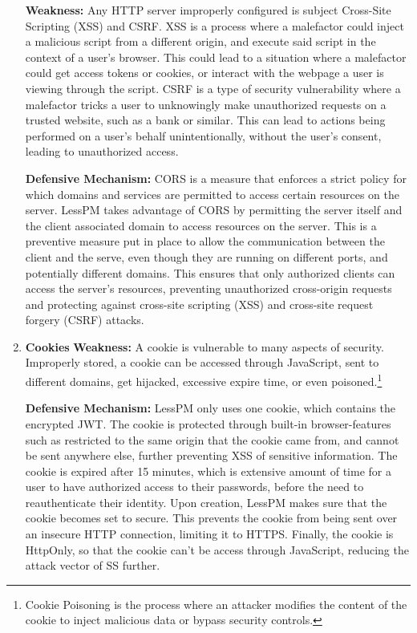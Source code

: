 \begin{enumerate}[label=$\blacktriangleright$]
  \textbf{Weakness:}
  Any HTTP server improperly configured is subject Cross-Site Scripting (XSS)
  and CSRF\@.
  XSS is a process where a malefactor could inject a malicious script from a
  different origin, and execute said script in the context of a user's browser.
  This could lead to a situation where a malefactor could get access tokens
  or cookies, or interact with the webpage a user is viewing through the
  script.
  CSRF is a type of security vulnerability where a malefactor tricks a user
  to unknowingly make unauthorized requests on a trusted website, such as a
  bank or similar.
  This can lead to actions being performed on a user's behalf unintentionally,
  without the user's consent, leading to unauthorized access.

  \textbf{Defensive Mechanism:}
  CORS is a measure that enforces a strict policy for which domains and services
  are permitted to access certain resources on the server.
  LessPM takes advantage of CORS by permitting the server itself and the
  client associated domain to access resources on the server.
  This is a preventive measure put in place to allow the communication
  between the client and the serve, even though they are running on different
  ports, and potentially different domains.
  This ensures that only authorized clients can access the server's resources,
  preventing unauthorized cross-origin requests and protecting against
  cross-site scripting (XSS) and cross-site request forgery (CSRF) attacks.

  \item \textbf{Cookies}
  \textbf{Weakness:}
  A cookie is vulnerable to many aspects of security.
  Improperly stored, a cookie can be accessed through JavaScript, sent to
  different domains, get hijacked, excessive expire time, or even poisoned.\footnote{
    Cookie Poisoning is the process where an attacker modifies the content of
    the cookie to inject malicious data or bypass security controls.
  }

  \textbf{Defensive Mechanism:}
  LessPM only uses one cookie, which contains the encrypted JWT\@.
  The cookie is protected through built-in browser-features such as
  restricted to the same origin that the cookie came from, and cannot be sent
  anywhere else, further preventing XSS of sensitive information\@.
  The cookie is expired after 15 minutes, which is extensive amount of time
  for a user to have authorized access to their passwords, before the need to
  reauthenticate their identity.
  Upon creation, LessPM makes sure that the cookie becomes set to secure.
  This prevents the cookie from being sent over an insecure HTTP connection,
  limiting it to HTTPS\@.
  Finally, the cookie is HttpOnly, so that the cookie can't be access through
  JavaScript, reducing the attack vector of SS further.

\end{enumerate}

